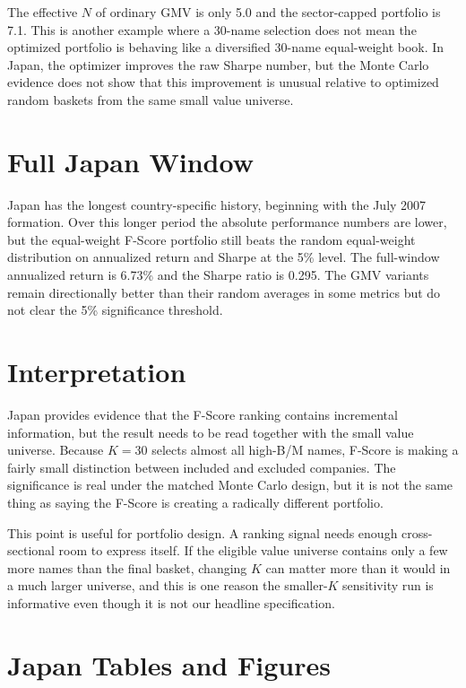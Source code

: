 \documentclass[11pt,a4paper]{report}
\numberwithin{figure}{chapter}
\numberwithin{table}{chapter}
\numberwithin{equation}{chapter}
\begin{document}
The effective $N$ of ordinary GMV is only 5.0 and the sector-capped portfolio is 7.1. This is another example where a 30-name selection does not mean the optimized portfolio is behaving like a diversified 30-name equal-weight book. In Japan, the optimizer improves the raw Sharpe number, but the Monte Carlo evidence does not show that this improvement is unusual relative to optimized random baskets from the same small value universe.

\section{Full Japan Window}

Japan has the longest country-specific history, beginning with the July 2007 formation. Over this longer period the absolute performance numbers are lower, but the equal-weight F-Score portfolio still beats the random equal-weight distribution on annualized return and Sharpe at the 5\% level. The full-window annualized return is 6.73\% and the Sharpe ratio is 0.295. The GMV variants remain directionally better than their random averages in some metrics but do not clear the 5\% significance threshold.

\section{Interpretation}

Japan provides evidence that the F-Score ranking contains incremental information, but the result needs to be read together with the small value universe. Because $K=30$ selects almost all high-B/M names, F-Score is making a fairly small distinction between included and excluded companies. The significance is real under the matched Monte Carlo design, but it is not the same thing as saying the F-Score is creating a radically different portfolio.

This point is useful for portfolio design. A ranking signal needs enough cross-sectional room to express itself. If the eligible value universe contains only a few more names than the final basket, changing $K$ can matter more than it would in a much larger universe, and this is one reason the smaller-$K$ sensitivity run is informative even though it is not our headline specification.

\section{Japan Tables and Figures}
\label{sec:japan_exhibits}
\end{document}
